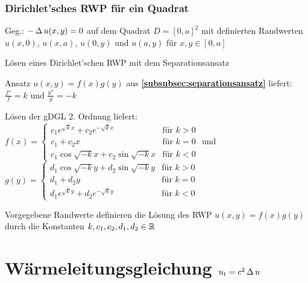 \documentclass[german,color,5pt]{latex4ei/latex4ei_fs}
\begin{document}
\begin{sectionbox}
	\subsubsection{Dirichlet'sches RWP für ein Quadrat}
	Geg.: $-\operatorname{\Delta} u(x,y)=0$ auf dem Quadrat $D=[0,a]^2$ mit definierten Randwerten $u(x,0)$, $u(x,a)$, $u(0,y)$ und $u(a,y)$ für $x,y\in [0,a]$
	\begin{cookbox}{Lösen eines Dirichlet'schen RWP mit dem Separationsansatz}
		\item Ansatz $u(x,y)=f(x)g(y)$ aus {\bf\ref{subsubsec:separationsansatz}} liefert: $\frac{f''}{f}=k$ und $\frac{g''}{g}=-k$
		\item Lösen der gDGL 2. Ordnung liefert:\\
		$f(x)=\begin{cases}
		c_1e^{\sqrt{k}x}+c_2e^{-\sqrt{k}x} & \text{für } k>0\\
		c_1+c_2x & \text{für }  k=0\\
		c_1\cos\sqrt{-k}x+c_2\sin\sqrt{-k}x & \text{für } k<0
		\end{cases}$ \qquad und \\
		$g(y)=\begin{cases}
		d_1\cos\sqrt{-k}y+d_2\sin\sqrt{-k}y & \text{für } k>0\\
		d_1+d_2y & \text{für }  k=0\\
		d_1e^{\sqrt{k}y}+d_2e^{-\sqrt{k}y} & \text{für } k<0
		\end{cases}$
		\item Vorgegebene Randwerte definieren die Lösung des RWP $u(x,y)=f(x)g(y)$ durch die Konstanten $k,c_1,c_2,d_1,d_2\in\operatorname{\mathbb R}$
	\end{cookbox}
\end{sectionbox}

\section{Wärmeleitungsgleichung \quad \(u_{t}=c^{2} \operatorname{\Delta}{u}\)}
\end{document}
